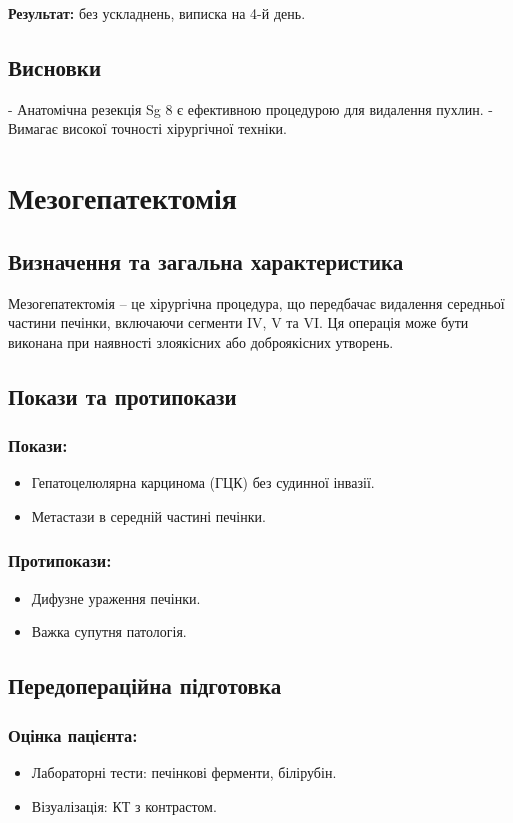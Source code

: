 \begin{refsection}
\textbf{Результат:} без ускладнень, виписка на 4-й день.

\subsection{Висновки}
- Анатомічна резекція Sg 8 є ефективною процедурою для видалення пухлин.
- Вимагає високої точності хірургічної техніки.

\section{Мезогепатектомія}
\subsection{Визначення та загальна характеристика}
Мезогепатектомія – це хірургічна процедура, що передбачає видалення середньої частини печінки, включаючи сегменти IV, V та VI. Ця операція може бути виконана при наявності злоякісних або доброякісних утворень.

\subsection{Покази та протипокази}
\subsubsection{Покази:}
\begin{itemize}
    \item Гепатоцелюлярна карцинома (ГЦК) без судинної інвазії.
    \item Метастази в середній частині печінки.
\end{itemize}

\subsubsection{Протипокази:}
\begin{itemize}
    \item Дифузне ураження печінки.
    \item Важка супутня патологія.
\end{itemize}

\subsection{Передопераційна підготовка}
\subsubsection{Оцінка пацієнта:}
\begin{itemize}
    \item Лабораторні тести: печінкові ферменти, білірубін.
    \item Візуалізація: КТ з контрастом.
\end{itemize}


\end{refsection}
